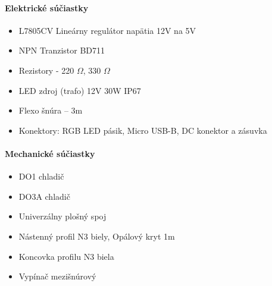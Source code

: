 \documentclass[12pt, a4paper]{article}
\begin{document}
\paragraph{Elektrické súčiastky}
\begin{itemize}
\itemsep0pt
\item L7805CV Lineárny regulátor napätia 12V na 5V
\item NPN Tranzistor BD711 
\item Rezistory - 220 $\Omega$, 330 $\Omega$
\item LED zdroj (trafo) 12V 30W IP67
\item Flexo šnúra – 3m
\item Konektory: RGB LED pásik, Micro USB-B, DC konektor a zásuvka
\end{itemize}

\paragraph{Mechanické súčiastky}
\begin{itemize}
\itemsep0pt
\item DO1 chladič
\item DO3A chladič
\item Univerzálny plošný spoj
\item Nástenný profil N3 biely, Opálový kryt 1m
\item Koncovka profilu N3 biela
\item Vypínač mezišnúrový
\end{itemize}

\end{document}
